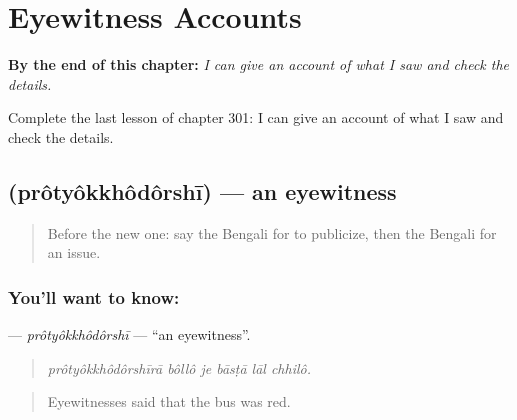 
\chapter{Eyewitness Accounts}
\label{ch:bn-eyewitness-accounts}

\begin{chapteropening}
\textbf{By the end of this chapter:} \emph{I can give an account of what I saw and check the details.}

Complete the last lesson of chapter 301: I can give an account of what I saw and check the details.
\end{chapteropening}

\section[\texorpdfstring{\bn{প্রত্যক্ষদর্শী} (prôtyôkkhôdôrshī)}{প্রত্যক্ষদর্শী (prôtyôkkhôdôrshī)}]{ (prôtyôkkhôdôrshī) — an eyewitness}

\label{lesson:BN-C301-protyokkhodorshi}



\begin{quote}
Before the new one: say the Bengali for to publicize, then the Bengali for an issue.
\end{quote}

\subsection*{You'll want to know: }
\textbf{} — \emph{prôtyôkkhôdôrshī} — \textquotedblleft{}an eyewitness\textquotedblright{}.

\begin{quote}
     
\end{quote}

\begin{quote}
\emph{prôtyôkkhôdôrshīrā bôllô je bāsṭā lāl chhilô.}
\end{quote}

\begin{quote}
Eyewitnesses said that the bus was red.
\end{quote}

